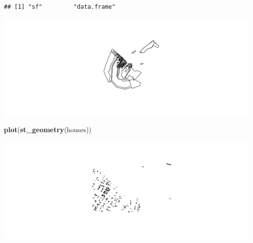 \documentclass[ignorenonframetext,]{beamer}
\newenvironment{Shaded}{\begin{snugshade}}{\end{snugshade}}
\newcommand{\KeywordTok}[1]{\textcolor[rgb]{0.13,0.29,0.53}{\textbf{#1}}}
\newcommand{\StringTok}[1]{\textcolor[rgb]{0.31,0.60,0.02}{#1}}
\newcommand{\OperatorTok}[1]{\textcolor[rgb]{0.81,0.36,0.00}{\textbf{#1}}}
\newcommand{\NormalTok}[1]{#1}
\begin{document}
\begin{frame}[fragile]{}

\begin{Shaded}
\end{Shaded}

\begin{verbatim}
## [1] "sf"         "data.frame"
\end{verbatim}

\begin{Shaded}
\end{Shaded}

\includegraphics{slides_all2gether_part2_files/figure-beamer/unnamed-chunk-201-1.pdf}

\begin{Shaded}
\begin{Highlighting}[]
\KeywordTok{plot}\NormalTok{(}\KeywordTok{st_geometry}\NormalTok{(houses))}
\end{Highlighting}
\end{Shaded}

\includegraphics{slides_all2gether_part2_files/figure-beamer/unnamed-chunk-202-1.pdf}

\end{frame}
\end{document}

